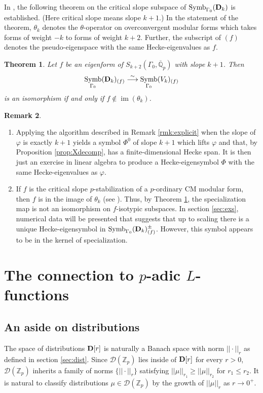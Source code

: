 \documentclass{amsart}
\theoremstyle{plain}
\newtheorem{thm}{Theorem}[section]
\theoremstyle{definition}
\newtheorem{remark}[thm]{Remark}
\newcommand{\D}{{\mathcal D}}
\newcommand{\bD}{{\bf D}}
\newcommand{\Z}{{\mathbb Z}}
\newcommand{\Q}{{\mathbb Q}}
\newcommand{\Qpbar}{\overline{{\Q}}_p}
\newcommand{\Zp}{\Z_p}
\newcommand{\lra}{\longrightarrow}
\newcommand{\Dvrig}[1]{\bD_{#1}}
\newcommand{\Dkrig}{\Dvrig{k}}
\newcommand{\Dla}{\D(\Zp)}
\DeclareMathOperator{\Symb}{Symb}
\DeclareMathOperator{\im}{im}
\newcommand{\MSo}[1]{\Symb_{\Gamma_0}(#1)}
\begin{document}
In \cite{PS}, the following theorem on the critical slope subspace of $\MSo{\Dkrig}$ is established.  (Here critical slope means slope $k+1$.)  In the statement of the theorem, $\theta_k$ denotes the $\theta$-operator on overconvergent modular forms which takes forms of weight $-k$ to forms of weight $k+2$.  Further, the subscript of $(f)$ denotes the pseudo-eigenspace with the same Hecke-eigenvalues as $f$.

\begin{thm}
\label{thm:criticalslope}
Let $f$ be an eigenform of $S_{k+2}(\Gamma_0,\Qpbar)$ with slope $k+1$.  Then
$$
\MSo{\Dkrig}_{(f)} \stackrel{\sim}{\lra} \MSo{V_k}_{(f)}
$$
is an isomorphism if and only if $f \notin \im(\theta_k)$.
\end{thm}

\vspace{.1cm}

\begin{remark}
~
\begin{enumerate}
\item
Applying the algorithm described in Remark \ref{rmk:explicit} when the slope of $\varphi$ is exactly $k+1$ yields a symbol $\Phi^0$ of slope $k+1$ which lifts $\varphi$ and that, by Proposition \ref{prop:Xdecomp}, has a finite-dimensional Hecke span.  It is then just an exercise in linear algebra to produce a Hecke-eigensymbol $\Phi$ with the same Hecke-eigenvalues as $\varphi$.  
\vspace{.1cm}
\item
If $f$ is the critical slope $p$-stabilization of a $p$-ordinary CM modular form, then $f$ is in the image of $\theta_k$ (see \cite[Proposition 7.1]{Coleman}).  Thus, by Theorem \ref{thm:criticalslope}, the specialization map is not an isomorphism on $f$-isotypic subspaces.  In section \ref{sec:exs}, numerical data will be presented that suggests that up to scaling there is a unique Hecke-eigensymbol in $\MSo{\Dkrig}^\pm_{(f)}$.
However, this symbol appears to be in the kernel of specialization.
\end{enumerate}
\end{remark}

\section{The connection to $p$-adic $L$-functions}

\subsection{An aside on distributions}
The space of distributions $\bD[r]$ is naturally a Banach space with norm  $|| \cdot ||_r$ as defined in section \ref{sec:dist}.  Since $\Dla$ lies inside of $\bD[r]$ for every $r>0$, $\Dla$ inherits a family of norms $\{ || \cdot ||_r \}$ satisfying $|| \mu ||_{r_1} \geq || \mu ||_{r_2}$ for $r_1 \leq
r_2$.  It is natural to classify distributions $\mu \in \Dla$ by the growth of $|| \mu ||_r$ as $r \to 0^+$.
\end{document}
